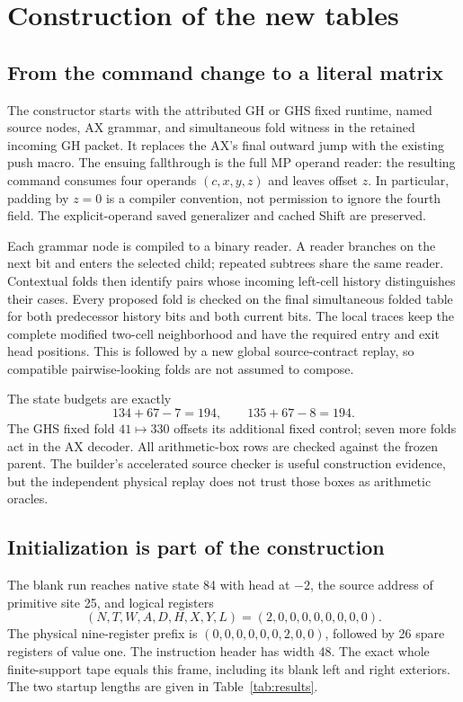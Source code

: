\documentclass[10pt,a4paper]{article}
\begin{document}
\section{Construction of the new tables}
\label{sec:construction}



\subsection{From the command change to a literal matrix}

The constructor starts with the attributed GH or GHS fixed runtime,
named source nodes, AX grammar, and simultaneous fold witness in the
retained incoming GH packet. It replaces the AX's final outward jump
with the existing push macro. The ensuing fallthrough is the full MP
operand reader: the resulting command consumes four operands
$(c,x,y,z)$ and leaves offset $z$. In particular, padding by $z=0$
is a compiler convention, not permission to ignore the fourth field.
The explicit-operand saved generalizer and cached Shift are preserved.

Each grammar node is compiled to a binary reader. A reader branches
on the next bit and enters the selected child; repeated subtrees share
the same reader. Contextual folds then identify pairs whose incoming
left-cell history distinguishes their cases. Every proposed fold is
checked on the final simultaneous folded table for both predecessor
history bits and both current bits. The local traces keep the complete
modified two-cell neighborhood and have the required entry and exit
head positions. This is followed by a new global source-contract replay,
so compatible pairwise-looking folds are not assumed to compose.

The state budgets are exactly
\[
        134+67-7=194,\qquad 135+67-8=194.
\]
The GHS fixed fold $41\mapsto330$ offsets its additional fixed
control; seven more folds act in the AX decoder. All arithmetic-box
rows are checked against the frozen parent. The builder's accelerated
source checker is useful construction evidence, but the independent
physical replay does not trust those boxes as arithmetic oracles.

\subsection{Initialization is part of the construction}

The blank run reaches native state 84 with head at $-2$, the source
address of primitive site 25, and logical registers
\[
 (N,T,W,A,D,H,X,Y,L)=(2,0,0,0,0,0,0,0,0).
\]
The physical nine-register prefix is
$(0,0,0,0,0,0,2,0,0)$, followed by 26 spare registers of value one.
The instruction header has width 48. The exact whole finite-support
tape equals this frame, including its blank left and right exteriors.
The two startup lengths are given in Table~\ref{tab:results}.
\end{document}

